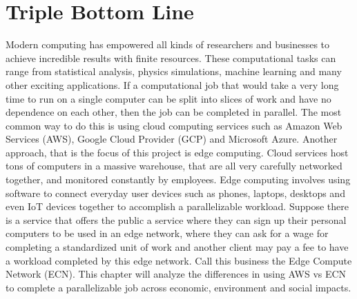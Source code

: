 \documentclass[../mthe-493-final-project.tex]{subfiles}
\begin{document}
    \chapter{Triple Bottom Line}
    \label{ch:triple-bottom-line}

    Modern computing has empowered all kinds of researchers and businesses to achieve incredible results with finite resources. These computational tasks can range from statistical analysis, physics simulations, machine learning and many other exciting applications. If a computational job that would take a very long time to run on a single computer can be split into slices of work and have no dependence on each other, then the job can be completed in parallel. The most common way to do this is using cloud computing services such as Amazon Web Services (AWS), Google Cloud Provider (GCP) and Microsoft Azure. Another approach, that is the focus of this project is edge computing. Cloud services host tons of computers in a massive warehouse, that are all very carefully networked together, and monitored constantly by employees. Edge computing involves using software to connect everyday user devices such as phones, laptops, desktops and even IoT devices together to accomplish a parallelizable workload. Suppose there is a service that offers the public a service where they can sign up their personal computers to be used in an edge network, where they can ask for a wage for completing a standardized unit of work and another client may pay a fee to have a workload completed by this edge network. Call this business the Edge Compute Network (ECN). This chapter will analyze the differences in using AWS vs ECN to complete a parallelizable job across economic, environment and social impacts. 
    
\end{document}
